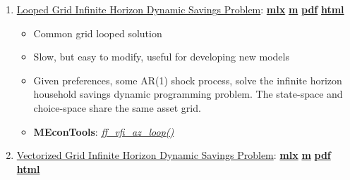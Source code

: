 \documentclass[
]{book}
\providecommand{\tightlist}{%
  \setlength{\itemsep}{0pt}\setlength{\parskip}{0pt}}
\begin{document}
\begin{enumerate}
\def\labelenumi{\arabic{enumi}.}
\tightlist
\item
  \href{https://fanwangecon.github.io/MEconTools/MEconTools/doc/vfi/htmlpdfm/fx_vfi_az_loop.html}{Looped Grid Infinite Horizon Dynamic Savings Problem}: \href{https://github.com/FanWangEcon/MEconTools/blob/master/MEconTools/doc/vfi/fx_vfi_az_loop.mlx}{\textbf{mlx}} \textbar{} \href{https://github.com/FanWangEcon/MEconTools/blob/master/MEconTools/doc/vfi/htmlpdfm/fx_vfi_az_loop.m}{\textbf{m}} \textbar{} \href{https://github.com/FanWangEcon/MEconTools/blob/master/MEconTools/doc/vfi/htmlpdfm/fx_vfi_az_loop.pdf}{\textbf{pdf}} \textbar{} \href{https://fanwangecon.github.io/MEconTools/MEconTools/doc/vfi/htmlpdfm/fx_vfi_az_loop.html}{\textbf{html}}

  \begin{itemize}
  \tightlist
  \item
    Common grid looped solution
  \item
    Slow, but easy to modify, useful for developing new models
  \item
    Given preferences, some AR(1) shock process, solve the infinite horizon household savings dynamic programming problem. The state-space and choice-space share the same asset grid.
  \item
    \textbf{MEconTools}: \emph{\href{https://github.com/FanWangEcon/MEconTools/blob/master/MEconTools/vfi/ff_vfi_az_loop.m}{ff\_vfi\_az\_loop()}}
  \end{itemize}
\item
  \href{https://fanwangecon.github.io/MEconTools/MEconTools/doc/vfi/htmlpdfm/fx_vfi_az_vec.html}{Vectorized Grid Infinite Horizon Dynamic Savings Problem}: \href{https://github.com/FanWangEcon/MEconTools/blob/master/MEconTools/doc/vfi/fx_vfi_az_vec.mlx}{\textbf{mlx}} \textbar{} \href{https://github.com/FanWangEcon/MEconTools/blob/master/MEconTools/doc/vfi/htmlpdfm/fx_vfi_az_vec.m}{\textbf{m}} \textbar{} \href{https://github.com/FanWangEcon/MEconTools/blob/master/MEconTools/doc/vfi/htmlpdfm/fx_vfi_az_vec.pdf}{\textbf{pdf}} \textbar{} \href{https://fanwangecon.github.io/MEconTools/MEconTools/doc/vfi/htmlpdfm/fx_vfi_az_vec.html}{\textbf{html}}


\end{enumerate}
\end{document}

